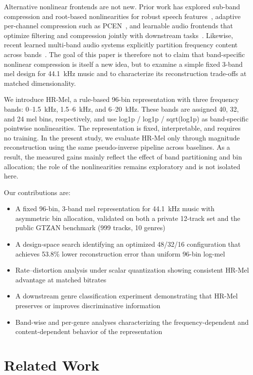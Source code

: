 \documentclass[twocolumn]{article}
\begin{document}
Alternative nonlinear frontends are not new. Prior work has explored sub-band compression and root-based nonlinearities for robust speech features~\cite{nasersharif2007mel,pncc2016}, adaptive per-channel compression such as PCEN~\cite{pcen2018}, and learnable audio frontends that optimize filtering and compression jointly with downstream tasks~\cite{leaf2021}. Likewise, recent learned multi-band audio systems explicitly partition frequency content across bands~\cite{luo2023bandsplit,bscodec2025,muffin2025}. The goal of this paper is therefore not to claim that band-specific nonlinear compression is itself a new idea, but to examine a simple fixed 3-band mel design for 44.1~kHz music and to characterize its reconstruction trade-offs at matched dimensionality.

We introduce HR-Mel, a rule-based 96-bin representation with three frequency bands: 0--1.5~kHz, 1.5--6~kHz, and 6--20~kHz. These bands are assigned 40, 32, and 24 mel bins, respectively, and use log1p / log1p / sqrt(log1p) as band-specific pointwise nonlinearities. The representation is fixed, interpretable, and requires no training. In the present study, we evaluate HR-Mel only through magnitude reconstruction using the same pseudo-inverse pipeline across baselines. As a result, the measured gains mainly reflect the effect of band partitioning and bin allocation; the role of the nonlinearities remains exploratory and is not isolated here.

Our contributions are:
\begin{itemize}
\item A fixed 96-bin, 3-band mel representation for 44.1~kHz music with asymmetric bin allocation, validated on both a private 12-track set and the public GTZAN benchmark (999 tracks, 10 genres)
\item A design-space search identifying an optimized 48/32/16 configuration that achieves 53.8\% lower reconstruction error than uniform 96-bin log-mel
\item Rate--distortion analysis under scalar quantization showing consistent HR-Mel advantage at matched bitrates
\item A downstream genre classification experiment demonstrating that HR-Mel preserves or improves discriminative information
\item Band-wise and per-genre analyses characterizing the frequency-dependent and content-dependent behavior of the representation
\end{itemize}

\section{Related Work}
\end{document}
